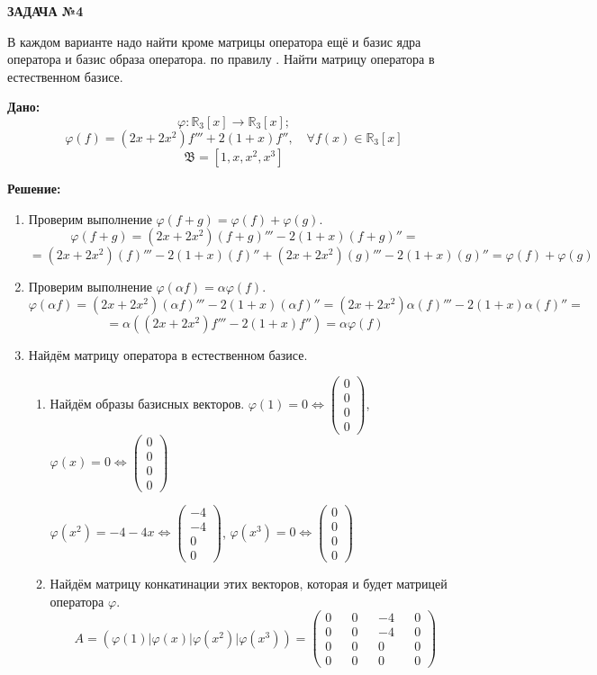 \documentclass[a4paper]{article}
\begin{document}
	\begin{center}
		\textbf{ЗАДАЧА №4}
	\end{center}
	\par
	В каждом варианте надо найти кроме матрицы оператора ещё и базис ядра 
	оператора и базис образа оператора.
	по правилу . 
	Найти матрицу оператора в естественном базисе.
	\par
	\textbf{Дано:}\\
	$$\varphi:\mathbb{R}_{3}[x]\rightarrow\mathbb{R}_{3}[x];$$
	$$\varphi(f)=(2x+2x^2)f'''+2(1+x)f'',\quad\forall{f(x)} \in \mathbb{R}_{3}[x]$$
	$$\mathfrak{B} = [1, x, x^2, x^3]$$
	\par
	\textbf{Решение:}
	\begin{enumerate}
		\item Проверим выполнение $\varphi(f+g)=\varphi(f)+\varphi(g)$.
		$$\varphi(f+g)=(2x+2x^2)(f+g)'''-2(1+x)(f+g)''=$$
		$$=(2x+2x^2)(f)'''-2(1+x)(f)''+(2x+2x^2)(g)'''-2(1+x)(g)''=\varphi(f)+\varphi(g)$$
		\item Проверим выполнение $\varphi(\alpha f)=\alpha\varphi(f)$.
		$$\varphi(\alpha f)=(2x+2x^2)(\alpha f)'''-2(1+x)(\alpha f)''=(2x+2x^2)\alpha (f)'''-2(1+x)\alpha (f)''=$$
		$$=\alpha((2x+2x^2)f'''-2(1+x)f'')=\alpha\varphi(f)$$
		\item Найдём матрицу оператора в естественном базисе.
		\begin{enumerate}
			\item Найдём образы базисных векторов.
			$\varphi(1) = 0 \Leftrightarrow \begin{pmatrix} 0 \\ 0 \\ 0 \\ 0 \end{pmatrix}$,
			$\varphi(x) = 0 \Leftrightarrow \begin{pmatrix} 0 \\ 0 \\ 0 \\ 0 \end{pmatrix}$
			\par
			$\varphi(x^2) = -4-4x \Leftrightarrow \begin{pmatrix} -4 \\ -4 \\ 0 \\ 0 \end{pmatrix}$,
			$\varphi(x^3) = 0 \Leftrightarrow \begin{pmatrix} 0 \\ 0 \\ 0 \\ 0 \end{pmatrix}$
			\item Найдём матрицу конкатинации этих векторов, которая и будет матрицей оператора $\varphi$.
			$$A=(\varphi(1)|\varphi(x)|\varphi(x^2)|\varphi(x^3))=\begin{pmatrix} 0 && 0 && -4 && 0 \\ 0 && 0 && -4 && 0 \\ 0 && 0 && 0 && 0 \\ 0 && 0 && 0 && 0 \end{pmatrix}$$
			

\end{enumerate}
\end{enumerate}
\end{document}
